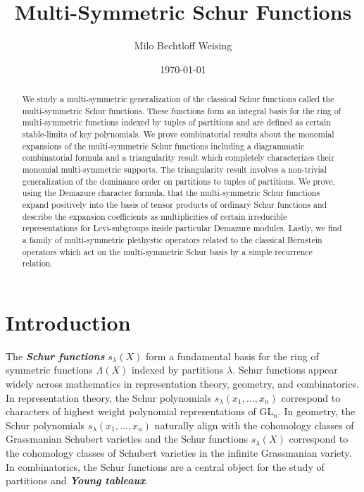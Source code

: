 \documentclass[12pt,reqno]{amsart}
\title{Multi-Symmetric Schur Functions}
\author{Milo Bechtloff Weising}
\date{\today}
\theoremstyle{definition}
\begin{document}
\begin{abstract}
    We study a multi-symmetric generalization of the classical Schur functions called the multi-symmetric Schur functions. These functions form an integral basis for the ring of multi-symmetric functions indexed by tuples of partitions and are defined as certain stable-limits of key polynomials. We prove combinatorial results about the monomial expansions of the multi-symmetric Schur functions including a diagrammatic combinatorial formula and a triangularity result which completely characterizes their monomial multi-symmetric supports. The triangularity result involves a non-trivial generalization of the dominance order on partitions to tuples of partitions. We prove, using the Demazure character formula, that the multi-symmetric Schur functions expand positively into the basis of tensor products of ordinary Schur functions and describe the expansion coefficients as multiplicities of certain irreducible representations for Levi-subgroups inside particular Demazure modules. Lastly, we find a family of multi-symmetric plethystic operators related to the classical Bernstein operators which act on the multi-symmetric Schur basis by a simple recurrence relation. 
\end{abstract}

\maketitle



\tableofcontents

\section{Introduction}

The \textbf{\textit{Schur functions}} $s_{\lambda}(X)$ form a fundamental basis for the ring of symmetric functions $\Lambda(X)$ indexed by partitions $\lambda.$ Schur functions appear widely across mathematics in representation theory, geometry, and combinatorics. In representation theory, the Schur polynomials $s_{\lambda}(x_1,\ldots,x_n)$ correspond to characters of highest weight polynomial representations of $\mathrm{GL}_n$. In geometry, the Schur polynomials $s_{\lambda}(x_1,\ldots,x_n)$ naturally align with the cohomology classes of Grassmanian Schubert varieties and the Schur functions $s_{\lambda}(X)$ correspond to the cohomology classes of Schubert varieties in the infinite Grassmanian variety. In combinatorics, the Schur functions are a central object for the study of partitions and \textbf{\textit{Young tableaux}}.
\end{document}
